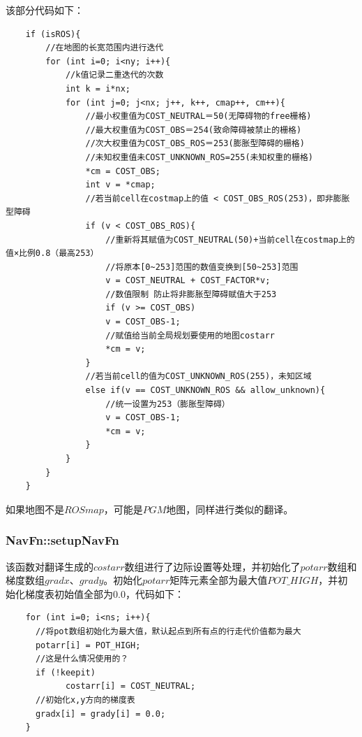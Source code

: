 \documentclass[9pt, oneside]{book}
\begin{document}
该部分代码如下：

\small
\begin{verbatim}
    if (isROS){
        //在地图的长宽范围内进行迭代
        for (int i=0; i<ny; i++){
            //k值记录二重迭代的次数
            int k = i*nx;
            for (int j=0; j<nx; j++, k++, cmap++, cm++){
                //最小权重值为COST_NEUTRAL＝50(无障碍物的free栅格)
                //最大权重值为COST_OBS＝254(致命障碍被禁止的栅格)
                //次大权重值为COST_OBS_ROS＝253(膨胀型障碍的栅格)
                //未知权重值未COST_UNKNOWN_ROS=255(未知权重的栅格)
                *cm = COST_OBS;
                int v = *cmap;
                //若当前cell在costmap上的值 < COST_OBS_ROS(253)，即非膨胀型障碍
                if (v < COST_OBS_ROS){
                    //重新将其赋值为COST_NEUTRAL(50)+当前cell在costmap上的值×比例0.8（最高253）
                    //将原本[0~253]范围的数值变换到[50~253]范围
                    v = COST_NEUTRAL + COST_FACTOR*v;
                    //数值限制 防止将非膨胀型障碍赋值大于253 
                    if (v >= COST_OBS)
                    v = COST_OBS-1;
                    //赋值给当前全局规划要使用的地图costarr
                    *cm = v;
                }
                //若当前cell的值为COST_UNKNOWN_ROS(255)，未知区域
                else if(v == COST_UNKNOWN_ROS && allow_unknown){
                    //统一设置为253（膨胀型障碍）
                    v = COST_OBS-1;
                    *cm = v;
                }
            }
        }
    }
\end{verbatim}
\normalsize

如果地图不是$ROS map$，可能是$PGM$地图，同样进行类似的翻译。

\subsubsection{NavFn::setupNavFn}

该函数对翻译生成的$costarr$数组进行了边际设置等处理，并初始化了$potarr$数组和梯度数组$gradx$、$grady$。初始化$potarr$矩阵元素全部为最大值$POT\_HIGH$，并初始化梯度表初始值全部为0.0，代码如下：

\begin{verbatim}
    for (int i=0; i<ns; i++){
      //将pot数组初始化为最大值，默认起点到所有点的行走代价值都为最大
      potarr[i] = POT_HIGH;
      //这是什么情况使用的？
      if (!keepit) 
            costarr[i] = COST_NEUTRAL;
      //初始化x,y方向的梯度表
      gradx[i] = grady[i] = 0.0;
    }
\end{verbatim}
\end{document}
